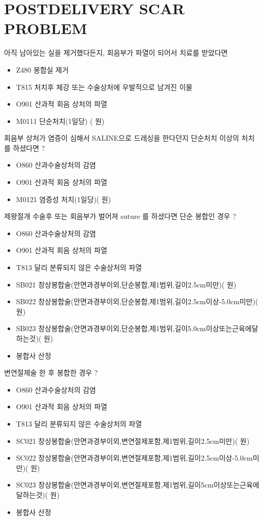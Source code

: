 \section{POSTDELIVERY SCAR PROBLEM}
아직 남아있는 실을 제거했다든지, 회음부가 파열이 되어서 치료를 받았다면
\begin{itemize}\tightlist
\item[\dsjuridical] Z480 봉합실 제거
\item[\dsjuridical] T815 처치후 체강 또는 수술상처에 우발적으로 남겨진 이물
\item[\dsjuridical] O901 산과적 회음 상처의 파열
\item[\dsmedical] M0111 단순처치(1일당) ( 원)
\end{itemize} 

회음부 상처가 염증이 심해서 SALINE으로 드레싱을 한다던지 단순처치 이상의 처치를 하셨다면 ?
\begin{itemize}\tightlist
\item[\dsjuridical] O860 산과수술상처의 감염
\item[\dsjuridical] O901 산과적 회음 상처의 파열
\item[\dsmedical] M0121 염증성 처치(1일당)( 원)
\end{itemize}

제왕절개 수술후 또는 회음부가 벌어져 suture 를 하셨다면 단순 봉합인 경우 ?
\begin{itemize}\tightlist
\item[\dsjuridical] O860 산과수술상처의 감염
\item[\dsjuridical] O901 산과적 회음 상처의 파열
\item[\dsjuridical] T813 달리 분류되지 않은 수술상처의 파열
\item[\dsmedical] SB021 창상봉합술(안면과경부이외,단순봉합,제1범위,길이2.5cm미만)( 원)
\item[\dsmedical] SB022 창상봉합술(안면과경부이외,단순봉합,제1범위,길이2.5cm이상-5.0cm미만)( 원)
\item[\dsmedical] SB023 창상봉합술(안면과경부이외,단순봉합,제1범위,길이5.0cm이상또는근육에달하는것)( 원)
\item[\dsmedical] 봉합사 산정
\end{itemize} 

변연절제술 한 후 봉합한 경우 ?
\begin{itemize}\tightlist
\item[\dsjuridical] O860 산과수술상처의 감염
\item[\dsjuridical] O901 산과적 회음 상처의 파열
\item[\dsjuridical] T813 달리 분류되지 않은 수술상처의 파열
\item[\dsmedical] SC021 창상봉합술(안면과경부이외,변연절제포함,제1범위,길이2.5cm미만)( 원)
\item[\dsmedical] SC022 창상봉합술(안면과경부이외,변연절제포함,제1범위,길이2.5cm이상-5.0cm미만)( 원)
\item[\dsmedical] SC023 창상봉합술(안면과경부이외,변연절제포함,제1범위,길이5cm이상또는근육에달하는것)( 원)
\item[\dsmedical] 봉합사 산정
\end{itemize} 
